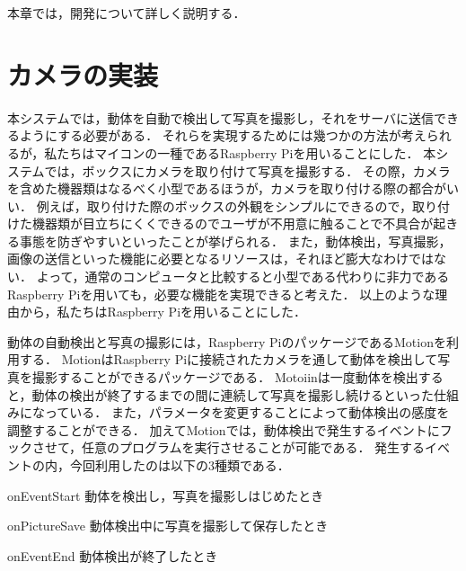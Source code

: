 \documentclass[../report]{subfiles}
\begin{document}
本章では，開発について詳しく説明する．


\section{カメラの実装}
本システムでは，動体を自動で検出して写真を撮影し，それをサーバに送信できるようにする必要がある．
それらを実現するためには幾つかの方法が考えられるが，私たちはマイコンの一種であるRaspberry Piを用いることにした．
本システムでは，ボックスにカメラを取り付けて写真を撮影する．
その際，カメラを含めた機器類はなるべく小型であるほうが，カメラを取り付ける際の都合がいい．
例えば，取り付けた際のボックスの外観をシンプルにできるので，取り付けた機器類が目立ちにくくできるのでユーザが不用意に触ることで不具合が起きる事態を防ぎやすいといったことが挙げられる．
また，動体検出，写真撮影，画像の送信といった機能に必要となるリソースは，それほど膨大なわけではない．
よって，通常のコンピュータと比較すると小型である代わりに非力であるRaspberry Piを用いても，必要な機能を実現できると考えた．
以上のような理由から，私たちはRaspberry Piを用いることにした．

動体の自動検出と写真の撮影には，Raspberry PiのパッケージであるMotionを利用する．
MotionはRaspberry Piに接続されたカメラを通して動体を検出して写真を撮影することができるパッケージである．
Motoiinは一度動体を検出すると，動体の検出が終了するまでの間に連続して写真を撮影し続けるといった仕組みになっている．
また，パラメータを変更することによって動体検出の感度を調整することができる．
加えてMotionでは，動体検出で発生するイベントにフックさせて，任意のプログラムを実行させることが可能である．
発生するイベントの内，今回利用したのは以下の3種類である．
\begin{description}
    \item{onEventStart} 動体を検出し，写真を撮影しはじめたとき
    \item{onPictureSave} 動体検出中に写真を撮影して保存したとき
    \item{onEventEnd} 動体検出が終了したとき
\end{description}
\end{document}
